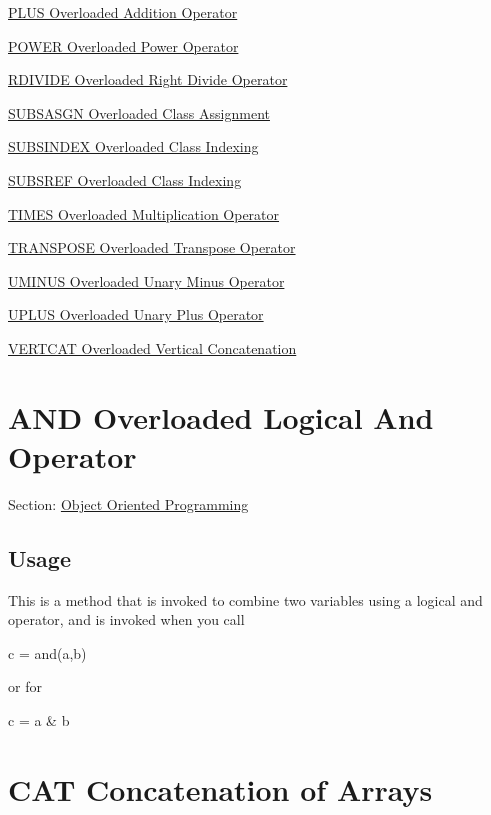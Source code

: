 \begin{DoxyItemize}
\item \hyperlink{class_plus}{P\-L\-U\-S Overloaded Addition Operator}  
\item \hyperlink{class_power}{P\-O\-W\-E\-R Overloaded Power Operator}  
\item \hyperlink{class_rdivide}{R\-D\-I\-V\-I\-D\-E Overloaded Right Divide Operator}  
\item \hyperlink{class_subsasgn}{S\-U\-B\-S\-A\-S\-G\-N Overloaded Class Assignment}  
\item \hyperlink{class_subsindex}{S\-U\-B\-S\-I\-N\-D\-E\-X Overloaded Class Indexing}  
\item \hyperlink{class_subsref}{S\-U\-B\-S\-R\-E\-F Overloaded Class Indexing}  
\item \hyperlink{class_times}{T\-I\-M\-E\-S Overloaded Multiplication Operator}  
\item \hyperlink{class_transpose}{T\-R\-A\-N\-S\-P\-O\-S\-E Overloaded Transpose Operator}  
\item \hyperlink{class_uminus}{U\-M\-I\-N\-U\-S Overloaded Unary Minus Operator}  
\item \hyperlink{class_uplus}{U\-P\-L\-U\-S Overloaded Unary Plus Operator}  
\item \hyperlink{class_vertcat}{V\-E\-R\-T\-C\-A\-T Overloaded Vertical Concatenation}  
\end{DoxyItemize}\hypertarget{class_and}{}\section{A\-N\-D Overloaded Logical And Operator}\label{class_and}
Section\-: \hyperlink{sec_class}{Object Oriented Programming} \hypertarget{vtkwidgets_vtkxyplotwidget_Usage}{}\subsection{Usage}\label{vtkwidgets_vtkxyplotwidget_Usage}
This is a method that is invoked to combine two variables using a logical and operator, and is invoked when you call \begin{DoxyVerb}   c = and(a,b)
\end{DoxyVerb}
 or for \begin{DoxyVerb}   c = a & b
\end{DoxyVerb}
 \hypertarget{class_cat}{}\section{C\-A\-T Concatenation of Arrays}\label{class_cat}
